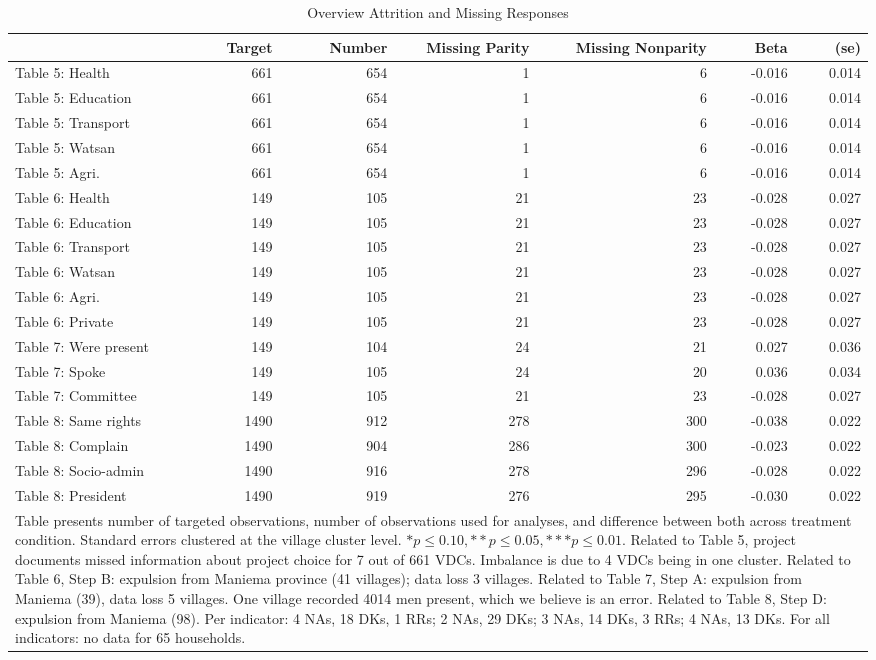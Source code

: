 \begin{table}[h!]
\centering
\caption{Overview Attrition and Missing Responses} 
\label{tab:attrition}
\begin{tabular}{lrrrrrr}
  & Target & Number & Missing Parity & Missing Nonparity & Beta & (se) \\ 
  \hline
\hline
Table 5: Health & 661 & 654 & 1 & 6 & -0.016 & 0.014 \\ 
  Table 5: Education & 661 & 654 & 1 & 6 & -0.016 & 0.014 \\ 
  Table 5: Transport & 661 & 654 & 1 & 6 & -0.016 & 0.014 \\ 
  Table 5: Watsan & 661 & 654 & 1 & 6 & -0.016 & 0.014 \\ 
  Table 5: Agri. & 661 & 654 & 1 & 6 & -0.016 & 0.014 \\ 
   \hline
Table 6: Health & 149 & 105 & 21 & 23 & -0.028 & 0.027 \\ 
  Table 6: Education & 149 & 105 & 21 & 23 & -0.028 & 0.027 \\ 
  Table 6: Transport & 149 & 105 & 21 & 23 & -0.028 & 0.027 \\ 
  Table 6: Watsan & 149 & 105 & 21 & 23 & -0.028 & 0.027 \\ 
  Table 6: Agri. & 149 & 105 & 21 & 23 & -0.028 & 0.027 \\ 
  Table 6: Private & 149 & 105 & 21 & 23 & -0.028 & 0.027 \\ 
   \hline
Table 7: Were present & 149 & 104 & 24 & 21 & 0.027 & 0.036 \\ 
  Table 7: Spoke & 149 & 105 & 24 & 20 & 0.036 & 0.034 \\ 
  Table 7: Committee & 149 & 105 & 21 & 23 & -0.028 & 0.027 \\ 
   \hline
Table 8: Same rights & 1490 & 912 & 278 & 300 & -0.038 & 0.022 \\ 
  Table 8: Complain & 1490 & 904 & 286 & 300 & -0.023 & 0.022 \\ 
  Table 8: Socio-admin & 1490 & 916 & 278 & 296 & -0.028 & 0.022 \\ 
  Table 8: President & 1490 & 919 & 276 & 295 & -0.030 & 0.022 \\ 
   \hline \hline \multicolumn{7}{p{16cm}}{Table presents number of targeted observations, number of observations used for analyses, and difference between both across treatment condition. Standard errors clustered at the village cluster level. $* p \le 0.10, ** p \le 0.05, *** p\le  0.01$. Related to Table 5, project documents missed information about project choice for 7 out of 661 VDCs. Imbalance is due to 4 VDCs being in one cluster. Related to Table 6, Step B: expulsion from Maniema province (41 villages); data loss 3 villages. Related to Table 7, Step A: expulsion from Maniema (39), data loss 5 villages. One village recorded 4014 men present, which we believe is an error. Related to Table 8, Step D: expulsion from Maniema (98). Per indicator: 4 NAs, 18 DKs, 1 RRs; 2 NAs, 29 DKs; 3 NAs, 14 DKs, 3 RRs; 4 NAs, 13 DKs. For all indicators: no data for 65 households.}\end{tabular}
\end{table}

